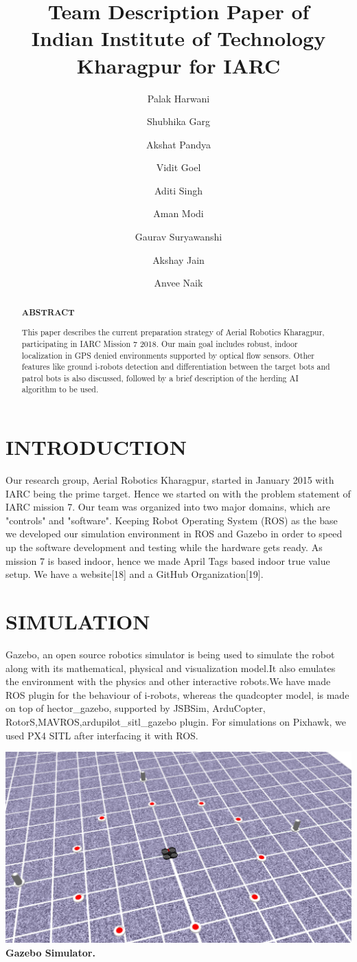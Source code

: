 \documentclass[12pt]{article}
\title{Team Description Paper of \\
Indian Institute of Technology Kharagpur for IARC}
\author[]{Palak Harwani}
\author[]{Shubhika Garg}
\author[]{Akshat Pandya}
\author[]{Vidit Goel}
\author[]{Aditi Singh}
\author[]{Aman Modi}
\author[]{Gaurav Suryawanshi}
\author[]{Akshay Jain}
\author[]{Anvee Naik}
\affil[]{Students\\ Indian Institute of Technology, Kharagpur}
\begin{document}
\maketitle
\begin{abstract}

\begin{center}\textbf{ABSTRACT}\end{center}
This paper describes the current preparation strategy of Aerial Robotics Kharagpur,
participating in IARC Mission 7 2018. Our main goal includes robust, indoor 
localization in GPS denied environments supported by optical flow sensors. 
Other features like ground i-robots detection and differentiation between the 
target bots and patrol bots is also discussed, followed by a brief description 
of the herding AI algorithm to be used.
\end{abstract}
\section{INTRODUCTION}
Our research group, Aerial Robotics Kharagpur, started in January 2015 with IARC 
being the prime target. Hence we started on with the problem statement of IARC 
mission 7. Our team was organized into two major domains, which are "controls" 
and "software". Keeping Robot Operating System (ROS) as the base we developed 
our simulation environment in ROS and Gazebo in order to speed up the software 
development and testing while the hardware gets ready. As mission 7 is based 
indoor, hence we made April Tags based indoor true value setup. We have a website[18] 
and a GitHub Organization[19].
\section{SIMULATION}
Gazebo, an open source robotics simulator is being used to simulate the robot along with its mathematical, physical and visualization model.It also emulates the environment with the physics and other interactive robots.We have made ROS plugin for the behaviour of i-robots, whereas the quadcopter model,
is made on top of hector\_gazebo, supported by JSBSim, ArduCopter, RotorS,MAVROS,ardupilot\_sitl\_gazebo plugin. For simulations on Pixhawk, we used PX4 SITL after interfacing it with ROS.
\begin{center}\includegraphics[scale=0.15]{sim} \\
\textbf{Gazebo Simulator.}\end{center}
\end{document}
